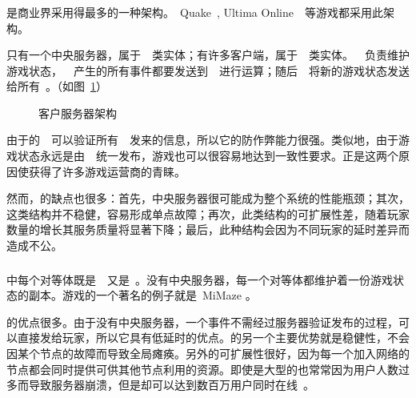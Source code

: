 \subsubsection{\csa} 

{\csa}是商业界采用得最多的一种架构。~Quake\textregistered~\cite{quake}, Ultima Online\tm~\cite{ultima}~等游戏都采用此架构。

{\csa}只有一个中央服务器，属于~\gss~类实体；有许多客户端，属于~\ioc~类实体。~\gss~负责维护游戏状态，~\ioc~产生的所有事件都要发送到~\gss~进行运算；随后~\gss~将新的游戏状态发送给所有~\ioc。（如图~\ref{CS}）

\begin{figure}[htbp]
\begin{center}
\caption{客户\/服务器架构}
\label{CS}
\end{center}
\end{figure}

由于{\csa}的~\gss~可以验证所有~\ioc~发来的信息，所以它的防作弊能力很强。类似地，由于游戏状态永远是由~\gss~统一发布，游戏也可以很容易地达到一致性要求。正是这两个原因使{\csa}获得了许多游戏运营商的青睐。

然而，{\csa}的缺点也很多：首先，中央服务器很可能成为整个系统的性能瓶颈；其次，这类结构并不稳健，容易形成单点故障；再次，此类结构的可扩展性差，随着玩家数量的增长其服务质量将显著下降；最后，此种结构会因为不同玩家的延时差异而造成不公。

\subsubsection{\pa}

{\pa}中每个对等体既是~\ioc~又是~\gss。没有中央服务器，每一个对等体都维护着一份游戏状态的副本。{\pa}游戏的一个著名的例子就是~MiMaze \cite{mimaze}。

{\pa}的优点很多。由于没有中央服务器，一个事件不需经过服务器验证发布的过程，可以直接发给玩家，所以它具有低延时的优点。{\pa}的另一个主要优势就是稳健性，不会因某个节点的故障而导致全局瘫痪。另外{\pa}的可扩展性很好，因为每一个加入网络的节点都会同时提供可供其他节点利用的资源。即使是大型的{\csa}也常常因为用户人数过多而导致服务器崩溃，但是{\pa}却可以达到数百万用户同时在线~\cite{real}。

